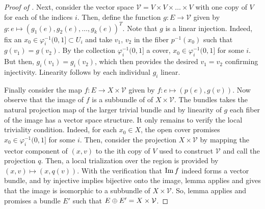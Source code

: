 \documentclass[../../sean_thesis.tex]{subfiles}
\begin{document}
\begin{proof}[Proof of ]
	Next, consider the vector space $\mathcal{V} = V \times V \times \dots \times V$ with one copy of $V$ for each of the indices $i$. Then, define the function $g: E \to \mathcal{V}$ given by $g: e \mapsto (g_1(e), g_2(e), \dots, g_k(e))^{T}$. Note that $g$ is a linear injection. Indeed, fix an $x_0 \in \varphi_i^{-1}(0,1] \subset U_i$ and take $v_1$, $v_2$ in the fiber $p^{-1}(x_0)$ such that $g(v_1) = g(v_2)$. By the collection $\varphi_i^{-1}(0,1]$ a cover, $x_0 \in \varphi_i^{-1}(0,1]$ for some $i$. But then, $g_i(v_1) = g_i(v_2)$, which then provides the desired $v_1 = v_2$ confirming injectivity. Linearity follows by each individual $g_i$ linear.
	
	Finally consider the map $f: E \to X \times \mathcal{V}$ given by $f: e \mapsto (p(e), g(v))$. Now observe that the image of $f$ is a subbundle of of $X \times \mathcal{V}$. The bundles takes the natural projection map of the larger trivial bundle and by linearity of $g$ each fiber of the image has a vector space structure. It only remains to verify the local triviality condition. Indeed, for each $x_0 \in X$, the open cover promises $x_0 \in \varphi_i^{-1}(0,1]$ for some $i$. Then, consider the projection $X \times \mathcal{V}$ by mapping the vector component of $(x,v)$ to the ith copy of $V$ used to construct $\mathcal{V}$ and call the projection $q$. Then, a local trialization over the region is provided by $(x,v) \mapsto (x, q(v))$. With the verification that $\operatorname{Im} f$ indeed forms a vector bundle, and by injective implies bijective onto the image, lemma  applies and gives that the image is isomorphic to a subbundle of $X \times \mathcal{V}$. So, lemma  applies and promises a bundle $E'$ such that $E \oplus E' = X \times \mathcal{V}$.
	
	
	
	\end{proof}
\end{document}
